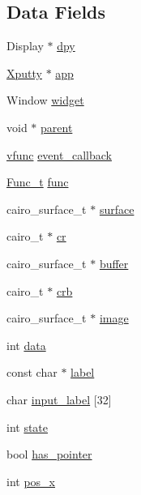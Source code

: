 \subsection*{Data Fields}
\begin{DoxyCompactItemize}
\item 
Display $\ast$ \hyperlink{structWidget__t_a5ae8f0fdd24c6baf15173dc0cc9ae360}{dpy}
\item 
\hyperlink{structXputty}{Xputty} $\ast$ \hyperlink{structWidget__t_a06eaa5b134c47983fd965e745cdbaa3b}{app}
\item 
Window \hyperlink{structWidget__t_acb2bfb41674371ee1220a9d6a2d89fb1}{widget}
\item 
void $\ast$ \hyperlink{structWidget__t_a483f6517c19fe09e1bf2eaec6646a14b}{parent}
\item 
\hyperlink{xwidget_8h_a6423c133fb634585762a77dda34befab}{vfunc} \hyperlink{structWidget__t_af0adf855c1991d11f59c5b6f9a2c526a}{event\+\_\+callback}
\item 
\hyperlink{structFunc__t}{Func\+\_\+t} \hyperlink{structWidget__t_a225b9a175e132994a5aa73b59a2911ad}{func}
\item 
cairo\+\_\+surface\+\_\+t $\ast$ \hyperlink{structWidget__t_ae9b5979742ea31817ff7d7b34a56f88d}{surface}
\item 
cairo\+\_\+t $\ast$ \hyperlink{structWidget__t_a26594f6ffabe98fc08f9207150fc9417}{cr}
\item 
cairo\+\_\+surface\+\_\+t $\ast$ \hyperlink{structWidget__t_a84d225e7b261d67daa764b47c8c62107}{buffer}
\item 
cairo\+\_\+t $\ast$ \hyperlink{structWidget__t_ad98022ee160d4c0906110868fc9e5664}{crb}
\item 
cairo\+\_\+surface\+\_\+t $\ast$ \hyperlink{structWidget__t_a4e179b5ae7494b9533c8673ec3642a55}{image}
\item 
int \hyperlink{structWidget__t_a9dd7b58be77bf31ab021aa627a73186a}{data}
\item 
const char $\ast$ \hyperlink{structWidget__t_a952020107ac1f6d9a37b4f978f77b61c}{label}
\item 
char \hyperlink{structWidget__t_ac5cb454301472edeb16e563ef2149dbb}{input\+\_\+label} \mbox{[}32\mbox{]}
\item 
int \hyperlink{structWidget__t_aaa935b64805fdeb78acb015c67d6638c}{state}
\item 
bool \hyperlink{structWidget__t_ac8c396c698d816afad49fa751c3ca2c8}{has\+\_\+pointer}
\item 
int \hyperlink{structWidget__t_ae2d46ffb30bb2335a043d138fa05e1a3}{pos\+\_\+x}

\end{DoxyCompactItemize}
